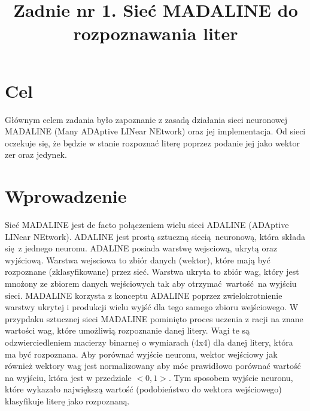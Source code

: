 \documentclass{classrep}
\author{
  \studentinfo{Szymon Łyszkowski}{206809}\and
  \studentinfo{Piotr Kluch}{206799}
}
\title{Zadnie nr 1. Sieć MADALINE do rozpoznawania liter}
\begin{document}
\maketitle

\section{Cel}
{
Głównym celem zadania było zapoznanie z zasadą działania sieci neuronowej MADALINE (Many ADAptive LINear NEtwork) oraz jej implementacja. Od sieci oczekuje się, że będzie w stanie rozpoznać literę poprzez podanie jej jako wektor zer oraz jedynek.}

\section{Wprowadzenie}
{Sieć MADALINE jest de facto połączeniem wielu sieci ADALINE (ADAptive LINear NEtwork). ADALINE jest prostą sztuczną siecią neuronową, która składa się z jednego neuronu. ADALINE posiada warstwę wejsciową, ukrytą oraz wyjściową. Warstwa wejsciowa to zbiór danych (wektor), które mają być rozpoznane (zklasyfikowane) przez sieć. Warstwa ukryta to zbiór wag, który jest mnożony ze zbiorem danych wejściowych tak aby otrzymać wartość na wyjściu sieci. MADALINE korzysta z konceptu ADALINE poprzez zwielokrotnienie warstwy ukrytej i produkcji wielu wyjść dla tego samego zbioru wejściowego.
W przypdaku sztucznej sieci MADALINE pominięto proces uczenia z racji na znane wartości wag, które umożliwią rozpoznanie danej litery. Wagi te są odzwierciedleniem macierzy binarnej o wymiarach (4x4) dla danej litery, która ma być rozpoznana. Aby porównać wyjście neuronu, wektor wejściowy jak również wektory wag jest normalizowany aby móc prawidłowo porównać wartość na wyjściu, która jest w przedziale $<0,1>$. Tym sposobem wyjście neuronu, które wykazało największą wartość (podobieństwo do wektora wejściowego) klasyfikuje literę jako rozpoznaną.
}
\end{document}
